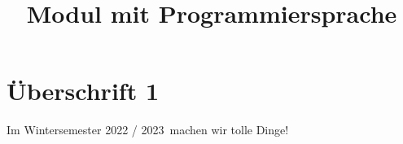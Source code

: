 \documentclass[12pt,a4paper]{article}
\newcommand{\semester}{Wintersemester 2022 / 2023}
\begin{document}
\title{Modul mit Programmiersprache}

\section*{Überschrift 1}

Im \semester\ machen wir tolle Dinge! 
\end{document}
